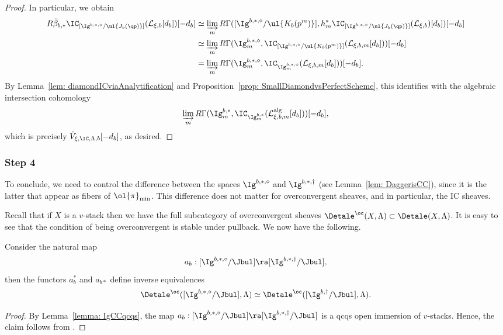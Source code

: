 \documentclass[letterpaper,11pt]{amsart}
\begin{document}
\begin{proof}
In particular, we obtain 
\begin{align*}
    R\tilde{\beta}_{b,\ast}\IC_{[\Ig^{b,\ast,\diamond}/\ul{J_b(\qp)}]}(\mathcal{L}_{\xi, b}[d_{b}])[-d_b] &\simeq \varinjlim_{m} R\Gamma([ \Ig^{b,\ast,\diamond}/\ul{K_{b}(p^{m})}], h_{m}^{*}\IC_{[ \Ig^{b,\ast,\diamond}/\ul{J_{b}(\qp)}]}(\mathcal{L}_{\xi, b})[d_b])[-d_{b}]\\
    &\simeq \varinjlim_{m} R\Gamma(\Ig^{b,\ast,\diamond}_{m}, \IC_{[ \Ig^{b,\ast,\diamond}/\ul{K_{b}(p^m)}]}(\mathcal{L}_{\xi, b,m}[d_b]))[-d_b] \\
    &= \varinjlim_{m} R\Gamma(\Ig^{b,\ast,\diamond}_{m}, \IC_{\Ig^{b,\ast,\diamond}_{m}}(\mathcal{L}_{\xi,b,m}[d_{b}]))[-d_b].
\end{align*}
By Lemma~\ref{lem: diamondICviaAnalytification} and Proposition~\ref{prop: SmallDiamondvsPerfectScheme}, this identifies with the algebraic intersection cohomology
\[\varinjlim_{m} R\Gamma(\Ig^{b,\ast}_{m},\IC_{\Ig^{b,\ast}_{m}}(\mathcal{L}_{\xi,b,m}^\mathrm{alg}[d_b]))[-d_{b}],\]
which is precisely $\hat{V}_{\xi,\IC,\Lambda,b}[-d_b]$, as desired.
\end{proof}

\subsubsection{Step 4}
To conclude, we need to control the difference between the spaces $\Ig^{b,\ast,\diamond}$ and $\Ig^{b,\ast,\dagger}$ (see Lemma~\ref{lem: DaggerisCC}), since it is the latter that appear as fibers of $\ol{\pi}_{\min}$. This difference does not matter for overconvergent sheaves, and in particular, the IC sheaves.

Recall that if $X$ is a $v$-stack then we have the full subcategory of overconvergent sheaves $\Detale^{\oc}(X,\Lambda)  \subset \Detale(X,\Lambda)$. It is easy to see that the condition of being overconvergent is stable under pullback. We now have the following.

\begin{proposition}{\label{prop: overconvergentreplacement}}
Consider the natural map \[a_{b}: [\Ig^{b,*,\diamond}/\Jbul] \ra [\Ig^{b,*,\dagger}/\Jbul],\] 
then the functors $a_{b}^{*}$ and $a_{b*}$ define inverse equivalences
\[ \Detale^{\oc}([\Ig^{b,*,\diamond}/\Jbul],\Lambda) \simeq \Detale^{\oc}([\Ig^{b,\dagger}/\Jbul],\Lambda).\]
\end{proposition}
\begin{proof}
By Lemma~\ref{lemma: IgCCqcqs}, the map $a_{b}: [\Ig^{b,*,\diamond}/\Jbul] \ra [\Ig^{b,*,\dagger}/\Jbul]$ is a qcqs open immersion of $v$-stacks. Hence, the claim follows from \cite[Lemma~4.4.7]{GHILZIsocComparison}.
\end{proof}
\end{document}
